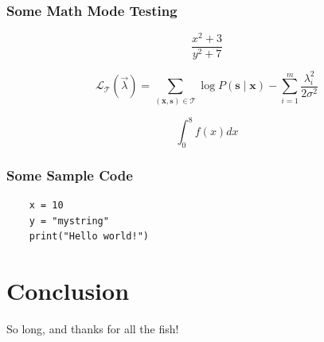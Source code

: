 \documentclass[aspectratio=169]{beamer}
\begin{document}
\begin{frame}
  \frametitle{Some Math Mode Testing}
  $$\frac{x^2+3}{y^2+7}$$

  \[
    \mathcal L_{\mathcal T}(\vec{\lambda})
    = \sum_{(\mathbf{x},\mathbf{s})\in \mathcal T}
       \log P(\mathbf{s}\mid\mathbf{x}) - \sum_{i=1}^m
       \frac{\lambda_i^2}{2\sigma^2}
  \]

  $$\int_0^8 f(x) dx$$
\end{frame}

\begin{frame}[fragile]
  \frametitle{Some Sample Code}

  \begin{verbatim}
    x = 10
    y = "mystring"
    print("Hello world!")
  \end{verbatim}

\end{frame}


\section{Conclusion}
\frame{\sectionpage}

\begin{frame}
  \begin{center}
    {\color{sigma@mainblue} So long, and thanks for all the fish!}
  \end{center}
\end{frame}
\end{document}
